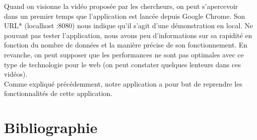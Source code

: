 \documentclass[12pt]{article}
\begin{document}
	Quand on visionne la vidéo proposée par les chercheurs, on peut s'apercevoir dans un premier
	temps que l’application est lancée depuis Google Chrome. Son URL* (localhost :8080)
	nous indique qu’il s’agit d’une démonstration en local. Ne pouvant pas tester l’application,
	nous avons peu d’informations sur sa rapidité en fonction du nombre de données et la manière
	précise de son fonctionnement. En revanche, on peut supposer que les performances ne
	sont pas optimales avec ce type de technologie pour le web (on peut constater
	quelques lenteurs dans ces vidéos).\\
	Comme expliqué précédemment, notre application a pour but de reprendre les
	fonctionnalités de cette application.
	
\newpage
	\section{Bibliographie}
\end{document}
